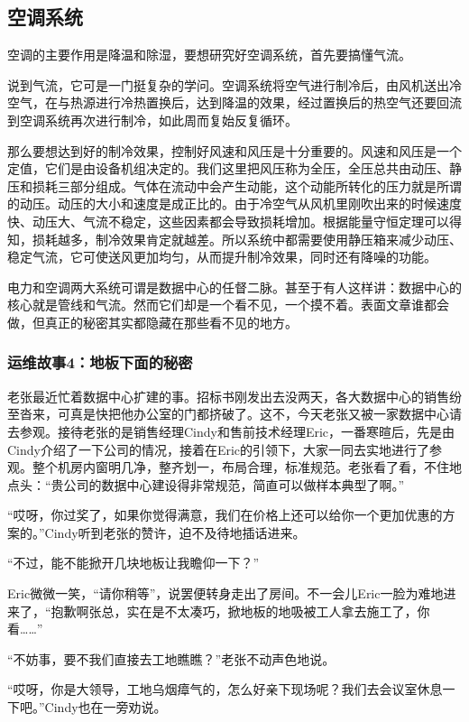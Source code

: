\documentclass[12pt,UTF8]{ctexbook}
\begin{document}
\subsection{空调系统}

空调的主要作用是降温和除湿，要想研究好空调系统，首先要搞懂气流。

说到气流，它可是一门挺复杂的学问。空调系统将空气进行制冷后，由风机送出冷空气，在与热源进行冷热置换后，达到降温的效果，经过置换后的热空气还要回流到空调系统再次进行制冷，如此周而复始反复循环。

那么要想达到好的制冷效果，控制好风速和风压是十分重要的。风速和风压是一个定值，它们是由设备机组决定的。我们这里把风压称为全压，全压总共由动压、静压和损耗三部分组成。气体在流动中会产生动能，这个动能所转化的压力就是所谓的动压。动压的大小和速度是成正比的。由于冷空气从风机里刚吹出来的时候速度快、动压大、气流不稳定，这些因素都会导致损耗增加。根据能量守恒定理可以得知，损耗越多，制冷效果肯定就越差。所以系统中都需要使用静压箱来减少动压、稳定气流，它可使送风更加均匀，从而提升制冷效果，同时还有降噪的功能。

电力和空调两大系统可谓是数据中心的任督二脉。甚至于有人这样讲：数据中心的核心就是管线和气流。然而它们却是一个看不见，一个摸不着。表面文章谁都会做，但真正的秘密其实都隐藏在那些看不见的地方。

\subsubsection{运维故事4：地板下面的秘密}

老张最近忙着数据中心扩建的事。招标书刚发出去没两天，各大数据中心的销售纷至沓来，可真是快把他办公室的门都挤破了。这不，今天老张又被一家数据中心请去参观。接待老张的是销售经理Cindy和售前技术经理Eric，一番寒暄后，先是由Cindy介绍了一下公司的情况，接着在Eric的引领下，大家一同去实地进行了参观。整个机房内窗明几净，整齐划一，布局合理，标准规范。老张看了看，不住地点头：“贵公司的数据中心建设得非常规范，简直可以做样本典型了啊。”

“哎呀，你过奖了，如果你觉得满意，我们在价格上还可以给你一个更加优惠的方案的。”Cindy听到老张的赞许，迫不及待地插话进来。

“不过，能不能掀开几块地板让我瞻仰一下？”

Eric微微一笑，“请你稍等”，说罢便转身走出了房间。不一会儿Eric一脸为难地进来了，“抱歉啊张总，实在是不太凑巧，掀地板的地吸被工人拿去施工了，你看……”

“不妨事，要不我们直接去工地瞧瞧？”老张不动声色地说。

“哎呀，你是大领导，工地乌烟瘴气的，怎么好亲下现场呢？我们去会议室休息一下吧。”Cindy也在一旁劝说。
\end{document}
